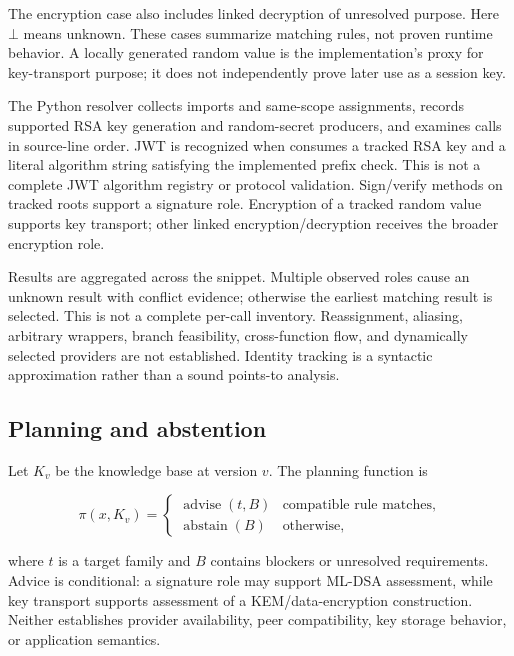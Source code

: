 \documentclass[conference,a4paper]{IEEEtran}
\begin{document}
The encryption case also includes linked decryption of unresolved purpose. Here \(\bot\) means unknown. These cases summarize matching rules, not proven runtime behavior. A locally generated random value is the implementation's proxy for key-transport purpose; it does not independently prove later use as a session key.

The Python resolver collects imports and same-scope assignments, records supported RSA key generation and random-secret producers, and examines calls in source-line order. JWT is recognized when  consumes a tracked RSA key and a literal algorithm string satisfying the implemented  prefix check. This is not a complete JWT algorithm registry or protocol validation. Sign/verify methods on tracked roots support a signature role. Encryption of a tracked random value supports key transport; other linked encryption/decryption receives the broader encryption role.

Results are aggregated across the snippet. Multiple observed roles cause an unknown result with conflict evidence; otherwise the earliest matching result is selected. This is not a complete per-call inventory. Reassignment, aliasing, arbitrary wrappers, branch feasibility, cross-function flow, and dynamically selected providers are not established. Identity tracking is a syntactic approximation rather than a sound points-to analysis.

\subsection{Planning and abstention}

Let \(K_v\) be the knowledge base at version \(v\). The planning function is

\begin{equation}
\pi(x,K_v)=\begin{cases}
\operatorname{advise}(t,B) & \text{compatible rule matches},\\
\operatorname{abstain}(B) & \text{otherwise},
\end{cases}
\end{equation}

where \(t\) is a target family and \(B\) contains blockers or unresolved requirements. Advice is conditional: a signature role may support ML-DSA assessment, while key transport supports assessment of a KEM/data-encryption construction. Neither establishes provider availability, peer compatibility, key storage behavior, or application semantics.
\end{document}
